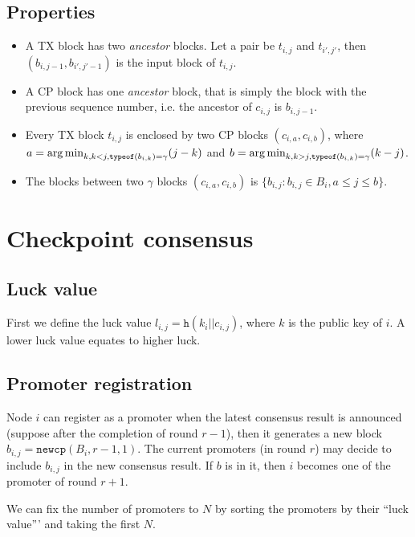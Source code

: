 \subsection{Properties}
\begin{itemize}
\item A TX block has two \emph{ancestor} blocks. Let a pair be $t_{i,j}$ and
  $t_{i',j'}$, then $(b_{i, j-1}, b_{i', j'-1})$ is the input block of $t_{i,j}$.

\item A CP block has one \emph{ancestor} block, that is simply the block with
  the previous sequence number, i.e. the ancestor of $c_{i,j}$ is $b_{i,j-1}$.

\item Every TX block $t_{i,j}$ is enclosed by two CP blocks $(c_{i,a},
  c_{i,b})$, where $a = \operatorname*{arg\,min}_{k, k < j, \texttt{typeof}(b_{i,k}) = \gamma}(j
  - k)$ and $b = \operatorname*{arg\,min}_{k, k > j, \texttt{typeof}(b_{i,k}) = \gamma}(k - j)$.

\item The blocks between two $\gamma$ blocks $(c_{i,a}, c_{i,b})$ is $\{b_{i,j}
  : b_{i,j} \in B_i, a \le j \le b\}$.

\end{itemize}

\section{Checkpoint consensus}

\subsection{Luck value}
First we define the luck value $l_{i,j} = \texttt{h}(k_i || c_{i,j})$, where $k$
is the public key of $i$. A lower luck value equates to higher luck.

\subsection{Promoter registration}
Node $i$ can register as a promoter when the latest consensus result is
announced (suppose after the completion of round $r-1$), then it generates a new
block $b_{i,j} = \texttt{newcp}(B_i, r-1, 1)$. The current promoters (in round
$r$) may decide to include $b_{i,j}$ in the new consensus result. If $b$ is in
it, then $i$ becomes one of the promoter of round $r+1$.

We can fix the number of promoters to $N$ by sorting the promoters by their
``luck value''' and taking the first $N$. 

